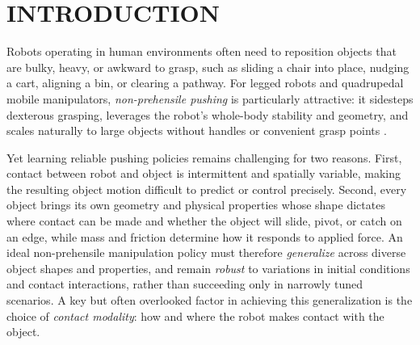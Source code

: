 \section{INTRODUCTION}

Robots operating in human environments often need to reposition objects that are bulky, heavy, or awkward to grasp, such as sliding a chair into place, nudging a cart, aligning a bin, or clearing a pathway. For legged robots and quadrupedal mobile manipulators, \emph{non-prehensile pushing} is particularly attractive: it sidesteps dexterous grasping, leverages the robot's whole-body stability and geometry, and scales naturally to large objects without handles or convenient grasp points \cite{stuber2020let}. 

Yet learning reliable pushing policies remains challenging for two reasons. First, contact between robot and object is intermittent and spatially variable, making the resulting object motion difficult to predict or control precisely. Second, every object brings its own geometry and physical properties whose shape dictates where contact can be made and whether the object will slide, pivot, or catch on an edge, while mass and friction determine how it responds to applied force. An ideal non-prehensile manipulation policy must therefore \emph{generalize} across diverse object shapes and properties, and remain \emph{robust} to variations in initial conditions and contact interactions, rather than succeeding only in narrowly tuned scenarios. A key but often overlooked factor in achieving this generalization is the choice of \emph{contact modality}: how and where the robot makes contact with the object.

